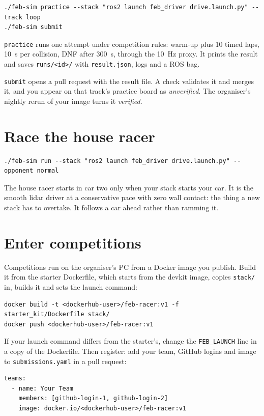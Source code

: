 \documentclass[11pt,a4paper]{article}
\newcommand{\file}[1]{\texttt{#1}}
\newcommand{\cmd}[1]{\texttt{#1}}
\begin{document}
\begin{lstlisting}
./feb-sim practice --stack "ros2 launch feb_driver drive.launch.py" --track loop
./feb-sim submit
\end{lstlisting}

\cmd{practice} runs one attempt under competition rules: warm-up plus 10 timed laps, 10~s per
collision, DNF after 300~s, through the 10~Hz proxy. It prints the result and saves
\file{runs/<id>/} with \file{result.json}, logs and a ROS bag.

\cmd{submit} opens a pull request with the result file. A check validates it and merges it,
and you appear on that track's practice board as \emph{unverified}. The organiser's nightly
rerun of your image turns it \emph{verified}.

\section{Race the house racer}

\begin{lstlisting}
./feb-sim run --stack "ros2 launch feb_driver drive.launch.py" --opponent normal
\end{lstlisting}

The house racer starts in car two only when your stack starts your car. It is the smooth
lidar driver at a conservative pace with zero wall contact: the thing a new stack has to
overtake. It follows a car ahead rather than ramming it.

\section{Enter competitions}

Competitions run on the organiser's PC from a Docker image you publish. Build it from the
starter Dockerfile, which starts from the devkit image, copies \file{stack/} in, builds it and
sets the launch command:

\begin{lstlisting}
docker build -t <dockerhub-user>/feb-racer:v1 -f starter_kit/Dockerfile stack/
docker push <dockerhub-user>/feb-racer:v1
\end{lstlisting}

If your launch command differs from the starter's, change the \texttt{FEB\_LAUNCH} line in a
copy of the Dockerfile. Then register: add your team, GitHub logins and image to
\file{submissions.yaml} in a pull request:

\begin{lstlisting}
teams:
  - name: Your Team
    members: [github-login-1, github-login-2]
    image: docker.io/<dockerhub-user>/feb-racer:v1
\end{lstlisting}
\end{document}
